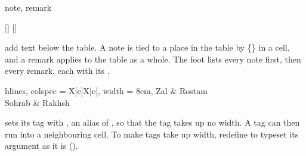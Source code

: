 \begin{codedescribe}[
        key,
        new=2021L
    ]{note, remark}
    \begin{codesyntax}
        []
        []
    \end{codesyntax}
     add text below the table. A note is tied to a place in the table by \{\} in a cell, and a remark applies to the table as a whole. The foot lists every note first, then every remark, each with its .

    \begin{codestore}[st=outer:note]
        \begin{talltblr}[
            caption = {The family of Rostam},
            note{a} = {Raised by the Simorgh.},
            note{b} = {A horse.},
            remark{Note} = {Not a happy family.},
            remark{Source} = {Ferdowsi, \emph{Shahnameh}.},
            ]{
            hlines, colspec = {X[c]X[c]}, width = 8cm,
            }
            Zal & Rostam             \\
            Sohrab          & Rakhsh
        \end{talltblr}\end{codestore}
    \begin{center}
    \end{center}
    \begin{tsremark}
         sets its tag with , an alias of , so that the tag takes up no width. A tag can then run into a neighbouring cell. To make tags take up width, redefine  to typeset its argument as it is ().
    \end{tsremark}
\end{codedescribe}

